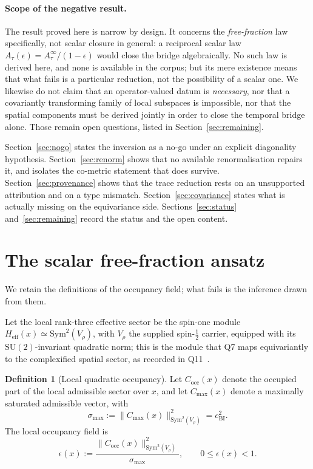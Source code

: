 \documentclass[12pt,a4paper]{article}
\theoremstyle{remark}
\theoremstyle{definition}
\newtheorem{definition}[theorem]{Definition}
\newcommand{\Sym}{\mathrm{Sym}}
\newcommand{\SU}{\mathrm{SU}}
\begin{document}
    \paragraph{Scope of the negative result.}
      The result proved here is narrow by design.
      It concerns the \emph{free-fraction} law specifically, not scalar closure in general: a
      reciprocal scalar law $A_{\tau}(\epsilon)=A_{\tau}^{\infty}/(1-\epsilon)$ would close the bridge
      algebraically.
      No such law is derived here, and none is available in the corpus; but its mere existence means
      that what fails is a particular reduction, not the possibility of a scalar one.
      We likewise do not claim that an operator-valued datum is \emph{necessary}, nor that a
      covariantly transforming family of local subspaces is impossible, nor that the spatial
      components must be derived jointly in order to close the temporal bridge alone.
      Those remain open questions, listed in Section~\ref{sec:remaining}.

    Section~\ref{sec:nogo} states the inversion as a no-go under an explicit diagonality hypothesis.
    Section~\ref{sec:renorm} shows that no available renormalisation repairs it, and isolates the
    co-metric statement that does survive.
    Section~\ref{sec:provenance} shows that the trace reduction rests on an unsupported attribution and
    on a type mismatch.
    Section~\ref{sec:covariance} states what is actually missing on the equivariance side.
    Sections~\ref{sec:status} and~\ref{sec:remaining} record the status and the open content.

  \section{The scalar free-fraction ansatz}
    \label{sec:occupancy}

    We retain the definitions of the occupancy field; what fails is the inference drawn from them.

    Let the local rank-three effective sector be the spin-one module
    $H_{\mathrm{eff}}(x)\simeq \Sym^{2}(V_{\rho})$, with $V_{\rho}$ the supplied spin-$\tfrac12$ carrier, equipped
    with its $\SU(2)$-invariant quadratic norm; this is the module that Q7 maps equivariantly to the complexified
    spatial sector, as recorded in Q11~\cite{Beau2026q11}.

    \begin{definition}[Local quadratic occupancy]
      \label{def:local-occupancy}
      Let $C_{\mathrm{occ}}(x)$ denote the occupied part of the local admissible sector over $x$, and
      let $C_{\mathrm{max}}(x)$ denote a maximally saturated admissible vector, with
      \[
        \sigma_{\mathrm{max}}
        :=\|C_{\mathrm{max}}(x)\|_{\Sym^{2}(V_{\rho})}^{2}
        =c_{\mathrm{BI}}^{2}.
      \]
      The local occupancy field is
      \[
        \epsilon(x)
        :=\frac{\|C_{\mathrm{occ}}(x)\|_{\Sym^{2}(V_{\rho})}^{2}}{\sigma_{\mathrm{max}}},
        \qquad 0\leq\epsilon(x)< 1 .
      \]
    \end{definition}
\end{document}
